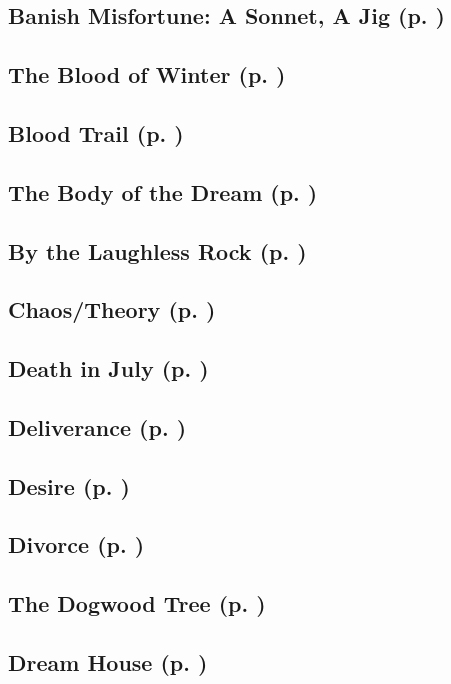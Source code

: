 \subsection*{Banish Misfortune: A Sonnet, A Jig (p. \pageref{ch:banish_misfortune})}
\subsection*{The Blood of Winter (p. \pageref{ch:the_blood_of_winter})}
\subsection*{Blood Trail (p. \pageref{ch:blood_trail})}
\subsection*{The Body of the Dream (p. \pageref{ch:the_body_of_the_dream})}
\subsection*{By the Laughless Rock (p. \pageref{ch:by_the_laughless_rock})}
\subsection*{Chaos/Theory (p. \pageref{ch:chaos_theory})}
\subsection*{Death in July (p. \pageref{ch:death_in_july})}
\subsection*{Deliverance (p. \pageref{ch:deliverance})}
\subsection*{Desire (p. \pageref{ch:desire})}
\subsection*{Divorce (p. \pageref{ch:divorce})}
\subsection*{The Dogwood Tree (p. \pageref{ch:dogwood_tree})}
\subsection*{Dream House (p. \pageref{ch:dream_house})}
